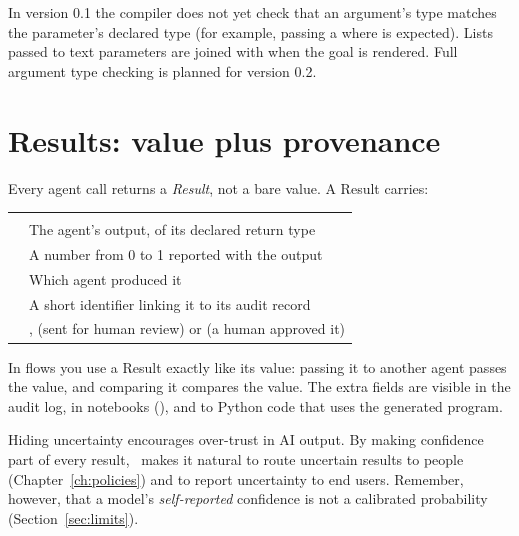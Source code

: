\begin{caution}
In version 0.1 the compiler does not yet check that an argument's type matches the parameter's declared type (for example, passing a  where  is expected). Lists passed to text parameters are joined with  when the goal is rendered. Full argument type checking is planned for version 0.2.
\end{caution}

\section{Results: value plus provenance}

Every agent call returns a \emph{Result}, not a bare value. A Result carries:

\begin{center}
\small
\begin{tabularx}{\linewidth}{@{}L{2.6cm}Y@{}}
\toprule
{} & \\
\goldrule
{} & The agent's output, of its declared return type\\
 & A number from 0 to 1 reported with the output\\
 & Which agent produced it\\
 & A short identifier linking it to its audit record\\
 & ,  (sent for human review) or  (a human approved it)\\
\bottomrule
\end{tabularx}
\end{center}

In flows you use a Result exactly like its value: passing it to another agent passes the value, and comparing it compares the value. The extra fields are visible in the audit log, in notebooks (), and to Python code that uses the generated program.

\begin{ethics}
Hiding uncertainty encourages over-trust in AI output. By making confidence part of every result, \algolang\ makes it natural to route uncertain results to people (Chapter~\ref{ch:policies}) and to report uncertainty to end users. Remember, however, that a model's \emph{self-reported} confidence is not a calibrated probability (Section~\ref{sec:limits}).
\end{ethics}


